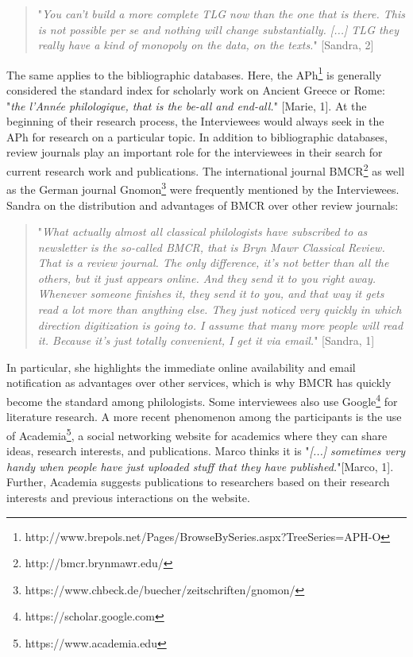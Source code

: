 \documentclass[12pt, a4paper, titlepage, oneside, abstract=true, toc=listof, toc=bibliography]{scrreprt}
\begin{document}
\begin{quotation}
"\textit{You can't build a more complete TLG now than the one that is there. This is not possible per se and nothing will change substantially. [...] TLG they really have a kind of monopoly on the data, on the texts.}" [Sandra, 2]
\end{quotation}

The same applies to the bibliographic databases. Here, the \gls{APh}\footnote{http://www.brepols.net/Pages/BrowseBySeries.aspx?TreeSeries=APH-O} is generally considered the standard index for scholarly work on Ancient Greece or Rome: "\textit{the l'Année philologique, that is the be-all and end-all.}" [Marie, 1]. At the beginning of their research process, the Interviewees would always seek in the APh for research on a particular topic. 
In addition to bibliographic databases, review journals play an important role for the interviewees in their search for current research work and publications. The international journal \gls{BMCR}\footnote{http://bmcr.brynmawr.edu/} as well as the German journal \gls{Gnomon}\footnote{https://www.chbeck.de/buecher/zeitschriften/gnomon/} were frequently mentioned by the Interviewees. Sandra on the distribution and advantages of BMCR over other review journals: 

\begin{quotation}
"\textit{What actually almost all classical philologists have subscribed to as newsletter is the so-called BMCR, that is Bryn Mawr Classical Review. That is a review journal. The only difference, it's not better than all the others, but it just appears online. And they send it to you right away. Whenever someone finishes it, they send it to you, and that way it gets read a lot more than anything else. They just noticed very quickly in which direction digitization is going to. I assume that many more people will read it. Because it's just totally convenient, I get it via email.}" [Sandra, 1]
\end{quotation}

In particular, she highlights the immediate online availability and email notification as advantages over other services, which is why BMCR has quickly become the standard among philologists. %
Some interviewees also use \gls{Google}\footnote{https://scholar.google.com} for literature research. 
A more recent phenomenon among the participants is the use of \gls{Academia}\footnote{https://www.academia.edu}, a social networking website for academics where they can share ideas, research interests, and publications. Marco thinks it is "\textit{[...] sometimes very handy when people have just uploaded stuff that they have published.}"[Marco, 1]. Further, Academia suggests publications to researchers based on their research interests and previous interactions on the website.
\end{document}
